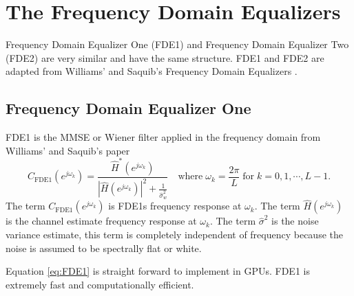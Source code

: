 \clearpage
\section{The Frequency Domain Equalizers}
\label{sec:FDE}
Frequency Domain Equalizer One (FDE1) and Frequency Domain Equalizer Two (FDE2) are very similar and have the same structure.
FDE1 and FDE2 are adapted from Williams' and Saquib's Frequency Domain Equalizers \cite[eq. (11) and (12)]{williams2013linear}.

\subsection{Frequency Domain Equalizer One}
FDE1 is the MMSE or Wiener filter applied in the frequency domain from Williams' and Saquib's paper \cite[eq. (11)]{williams2013linear}
\begin{equation}
C_\text{FDE1}(e^{j\omega_k}) = \frac{\hat{H}^\ast(e^{j\omega_k})}  {|\hat{H}(e^{j\omega_k})|^2  +  \frac{1}{\hat{\sigma}^2_w}} \quad
\text{where} \;
\omega_k = \frac{2\pi}{L} \;
\text{for} \;
k=0,1,\cdots,L-1.
\label{eq:FDE1}
\end{equation}
The term $C_\text{FDE1}(e^{j\omega_k})$ is FDE1s frequency response at $\omega_k$.
The term $\hat{H}(e^{j\omega_k})$ is the channel estimate frequency response at $\omega_k$.
The term $\hat{\sigma}^2$ is the noise variance estimate, this term is completely independent of frequency because the noise is assumed to be spectrally flat or white.

Equation \eqref{eq:FDE1} is straight forward to implement in GPUs.
FDE1 is extremely fast and computationally efficient.

